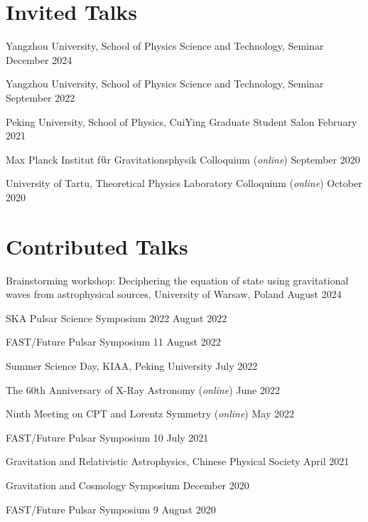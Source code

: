\newcommand{\playsymbol}{$\blacktriangleright$}
\section{\sc Invited Talks}
\begin{etaremune}
  \item 
  Yangzhou University, School of Physics Science and Technology, Seminar \hfill{} December 2024
  \item 
  Yangzhou University, School of Physics Science and Technology, Seminar
  \hfill{} 
  September 2022
\item 
  Peking University, School of Physics, CuiYing Graduate Student Salon
  \hfill{} 
  February 2021
\item
  Max Planck Institut f$\rm \ddot{u}$r Gravitationsphysik Colloquium ({\it online})
  \hfill{}
  September 2020
\item
  University of Tartu, Theoretical Physics Laboratory Colloquium ({\it online})
  \hfill{}
  October 2020
\end{etaremune}

\section{\sc Contributed Talks}
\begin{etaremune}
\item 
Brainstorming workshop: Deciphering the equation of state using gravitational waves from astrophysical sources, University of Warsaw, Poland \hfill{} August 2024
\item
  SKA Pulsar Science Symposium 2022
  \hfill{}
  August 2022
\item  
  FAST/Future Pulsar Symposium 11
  \hfill 
  August 2022
\item  
  Summer Science Day, KIAA, Peking University
  \hfill 
  July 2022
\item 
  The 60th Anniversary of X-Ray Astronomy ({\it online})
  \hfill 
  June 2022
\item 
  Ninth Meeting on CPT and Lorentz Symmetry ({\it online})
  \hfill
  May 2022
\item  
  FAST/Future Pulsar Symposium 10
  \hfill 
  July 2021
\item  
  Gravitation and Relativistic Astrophysics, Chinese Physical Society
  \hfill 
  April 2021
\item 
  Gravitation and Cosmology Symposium
  \hfill 
  December 2020
\item 
  FAST/Future Pulsar Symposium 9
  \hfill 
  August 2020
\end{etaremune}


